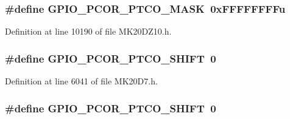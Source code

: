 \subsubsection[{\texorpdfstring{G\+P\+I\+O\+\_\+\+P\+C\+O\+R\+\_\+\+P\+T\+C\+O\+\_\+\+M\+A\+SK}{GPIO_PCOR_PTCO_MASK}}]{\setlength{\rightskip}{0pt plus 5cm}\#define G\+P\+I\+O\+\_\+\+P\+C\+O\+R\+\_\+\+P\+T\+C\+O\+\_\+\+M\+A\+SK~0x\+F\+F\+F\+F\+F\+F\+F\+Fu}\hypertarget{group___g_p_i_o___register___masks_ga0b8378768ee61ea2c685a1687c90fa03}{}\label{group___g_p_i_o___register___masks_ga0b8378768ee61ea2c685a1687c90fa03}


Definition at line 10190 of file M\+K20\+D\+Z10.\+h.

\subsubsection[{\texorpdfstring{G\+P\+I\+O\+\_\+\+P\+C\+O\+R\+\_\+\+P\+T\+C\+O\+\_\+\+S\+H\+I\+FT}{GPIO_PCOR_PTCO_SHIFT}}]{\setlength{\rightskip}{0pt plus 5cm}\#define G\+P\+I\+O\+\_\+\+P\+C\+O\+R\+\_\+\+P\+T\+C\+O\+\_\+\+S\+H\+I\+FT~0}\hypertarget{group___g_p_i_o___register___masks_ga5c9203b830cbd86cd8d0189872b5c772}{}\label{group___g_p_i_o___register___masks_ga5c9203b830cbd86cd8d0189872b5c772}


Definition at line 6041 of file M\+K20\+D7.\+h.

\subsubsection[{\texorpdfstring{G\+P\+I\+O\+\_\+\+P\+C\+O\+R\+\_\+\+P\+T\+C\+O\+\_\+\+S\+H\+I\+FT}{GPIO_PCOR_PTCO_SHIFT}}]{\setlength{\rightskip}{0pt plus 5cm}\#define G\+P\+I\+O\+\_\+\+P\+C\+O\+R\+\_\+\+P\+T\+C\+O\+\_\+\+S\+H\+I\+FT~0}\hypertarget{group___g_p_i_o___register___masks_ga5c9203b830cbd86cd8d0189872b5c772}{}\label{group___g_p_i_o___register___masks_ga5c9203b830cbd86cd8d0189872b5c772}


